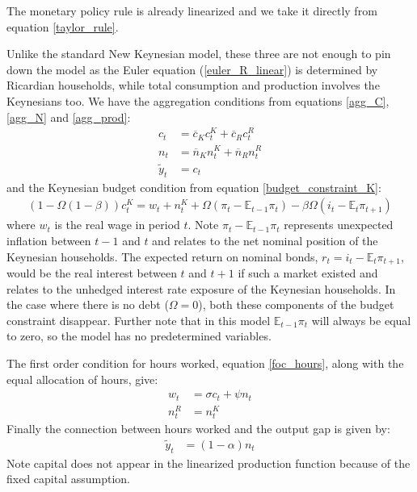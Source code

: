 \documentclass[12pt,a4paper]{article}
\begin{document}
The monetary policy rule is already linearized and we take it directly from equation \ref{taylor_rule}.

Unlike the standard New Keynesian model, these three are not enough to pin down the model as the Euler equation (\ref{euler_R_linear}) is determined by Ricardian households, while total consumption and production involves the Keynesians too. We have the aggregation conditions from equations \ref{agg_C}, \ref{agg_N} and \ref{agg_prod}:
\begin{align}
c_t &= \overline{c}_{K} c^K_t + \overline{c}_{R} c^R_t \label{agg_C_linear} \\
n_t &= \overline{n}_{K} n^K_t + \overline{n}_{R} n^R_t \label{agg_N_linear} \\
\tilde{y}_t &= c_t \label{agg_prod_linear}
\end{align}
and the Keynesian budget condition from equation \ref{budget_constraint_K}:
\begin{align}
(1-\Omega (1-\beta)) c^K_t = w_t + n^K_t + \Omega \left(\pi_t - \mathbb{E}_{t-1}\pi_t\right) - \beta \Omega  (i_t - \mathbb{E}_t \pi_{t+1})  \label{budget_constraint_K_linear}
\end{align}
where $w_t$ is the real wage in period $t$. Note $\pi_t - \mathbb{E}_{t-1}\pi_t$ represents unexpected inflation between $t-1$ and $t$ and relates to the net nominal position of the Keynesian households. The expected return on nominal bonds, $r_t = i_t - \mathbb{E}_t \pi_{t+1}$, would be the real interest between $t$ and $t+1$ if such a market existed and relates to the unhedged interest rate exposure of the Keynesian households. In the case where there is no debt ($\Omega=0$), both these components of the budget constraint disappear. Further note that in this model $\mathbb{E}_{t-1}\pi_t$ will always be equal to zero, so the model has no predetermined variables.

The first order condition for hours worked, equation \ref{foc_hours}, along with the equal allocation of hours, give:
\begin{align}
w_t &= \sigma c_t + \psi n_t \label{foc_hours_linear} \\
n^R_t &= n^K_t
\end{align}
Finally the connection between hours worked and the output gap is given by:
\begin{align}
\tilde{y}_t &= (1-\alpha)n_t  \label{production_linear}
\end{align}
Note capital does not appear in the linearized production function because of the fixed capital assumption.
\end{document}
